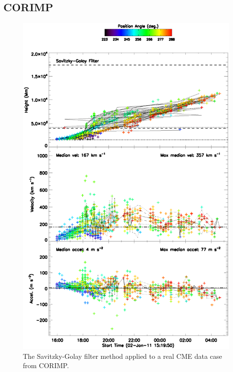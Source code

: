 \documentclass[structabstract]{aa}
\begin{document}
\subsection{CORIMP}
\label{subsect:corimp}

\begin{figure}
\centering
\includegraphics[scale=0.5, trim=50 0 0 0]{images/plot_kins_quartiles_2011-01-02T17_45_57_sav_gol.eps}
\caption{The Savitzky-Golay filter method applied to a real CME data case from CORIMP.}
\label{fig_savgol_CME_CORIMP}
\end{figure}
\end{document}
